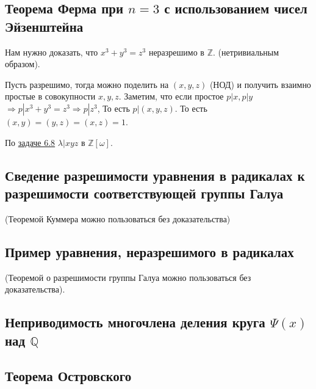 \documentclass[../main.tex]{subfiles}
\begin{document}
\hypertarget{9.6}{\subsection{Теорема Ферма при $n = 3$ с использованием чисел
Эйзенштейна}}
    Нам нужно доказать, что $x^3 + y^3 = z^3$ неразрешимо в $\mathbb{Z}$.
    (нетривиальным образом).

    Пусть разрешимо, тогда можно поделить на $(x, y, z)$ (НОД) и получить
    взаимно простые в совокупности $x, y, z$. Заметим, что если простое
    $p | x, p | y$ $\Rightarrow p | x^3 + y^3 = z^3 \Rightarrow p | z^3$,
    То есть $p | (x, y, z)$. То есть $(x, y) = (y, z) = (x, z) = 1$.

    По \hyperlink{6.8}{задаче 6.8} $\lambda | xyz$ в $\mathbb{Z}[\omega]$.


\hypertarget{9.7}{\subsection{Сведение разрешимости уравнения в радикалах к разрешимости соответствующей группы Галуа}}
(Теоремой Куммера можно пользоваться без доказательства)
\hypertarget{9.8}{\subsection{Пример уравнения, неразрешимого в радикалах}}
(Теоремой о разрешимости группы Галуа можно пользоваться без доказательства).

\hypertarget{9.9}{\subsection{Неприводимость многочлена деления круга $\Psi(x)$ над $\mathbb{Q}$}}

\hypertarget{9.10}{\subsection{Теорема Островского}}
\end{document}
